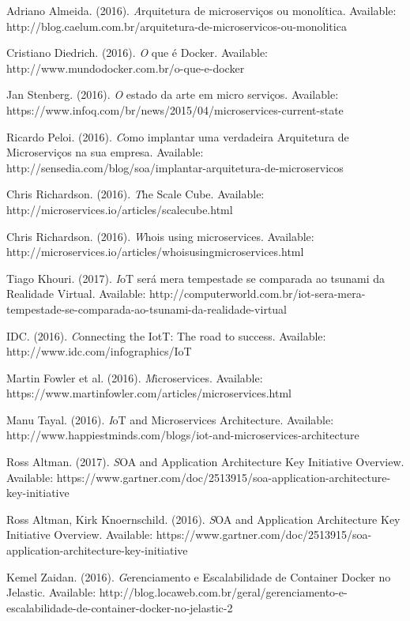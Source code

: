\documentclass[journal]{IEEEtran}
\begin{document}
\begin{thebibliography}{1}
Adriano Almeida. (2016). \emph Arquitetura de microserviços ou monolítica. Available: http://blog.caelum.com.br/arquitetura-de-microservicos-ou-monolitica 

Cristiano Diedrich. (2016). \emph O que é Docker. Available: http://www.mundodocker.com.br/o-que-e-docker 

Jan Stenberg. (2016). \emph O estado da arte em micro serviços. Available: https://www.infoq.com/br/news/2015/04/microservices-current-state 

Ricardo Peloi. (2016). \emph Como implantar uma verdadeira Arquitetura de Microserviços na sua empresa. Available: http://sensedia.com/blog/soa/implantar-arquitetura-de-microservicos 

Chris Richardson. (2016). \emph The Scale Cube. Available: http://microservices.io/articles/scalecube.html 

Chris Richardson. (2016). \emph Whois using microservices. Available: http://microservices.io/articles/whoisusingmicroservices.html 

Tiago Khouri. (2017). \emph IoT será mera tempestade se comparada ao tsunami da Realidade Virtual. Available: http://computerworld.com.br/iot-sera-mera-tempestade-se-comparada-ao-tsunami-da-realidade-virtual 

IDC. (2016). \emph Connecting the IotT: The road to success. Available: http://www.idc.com/infographics/IoT 

Martin Fowler et al. (2016). \emph Microservices. Available: https://www.martinfowler.com/articles/microservices.html 

Manu Tayal. (2016). \emph IoT and Microservices Architecture. Available: http://www.happiestminds.com/blogs/iot-and-microservices-architecture 

Ross Altman. (2017). \emph SOA and Application Architecture Key Initiative Overview. Available: https://www.gartner.com/doc/2513915/soa-application-architecture-key-initiative 

Ross Altman, Kirk Knoernschild. (2016). \emph SOA and Application Architecture Key Initiative Overview. Available: https://www.gartner.com/doc/2513915/soa-application-architecture-key-initiative 

Kemel Zaidan. (2016). \emph Gerenciamento e Escalabilidade de Container Docker no Jelastic. Available: http://blog.locaweb.com.br/geral/gerenciamento-e-escalabilidade-de-container-docker-no-jelastic-2 


\end{thebibliography}
\end{document}
